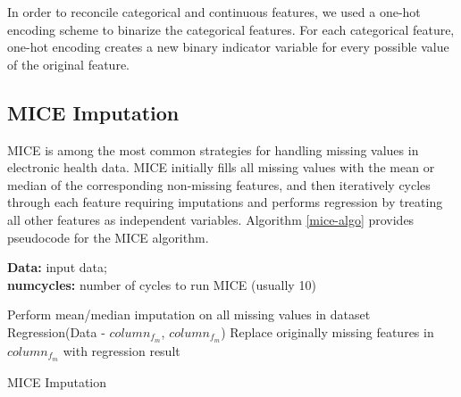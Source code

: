 \documentclass[review]{elsarticle}
\begin{document}
In order to reconcile categorical and continuous features, we used a one-hot encoding scheme to binarize the categorical features. For each categorical feature, one-hot encoding creates a new binary indicator variable for every possible value of the original feature. 

\subsection*{MICE Imputation}
MICE is among the most common strategies for handling missing values in electronic health data\cite{azur2011multiple}. MICE initially fills all missing values with the mean or median of the corresponding non-missing features, and then iteratively cycles through each feature requiring imputations and performs regression by treating all other features as independent variables. Algorithm \ref{mice-algo} provides pseudocode for the MICE algorithm.
	
\begin{algorithm}[H]
	\hspace*{\algorithmicindent} \textbf{Data:} input data; \\ \hspace*{\algorithmicindent} \textbf{numcycles:} number of cycles to run MICE (usually 10)
	\begin{algorithmic}[1]
			\State Perform mean/median imputation on all missing values in dataset
					\State Regression(Data - $column_{f_m}$, $column_{f_m}$)
					\State Replace originally missing features in $column_{f_m}$ with regression result
				\EndFor
			\EndFor
		\EndFunction
		
	\end{algorithmic}
	\caption{MICE Imputation}
	\label{mice-algo}
\end{algorithm}
\end{document}
